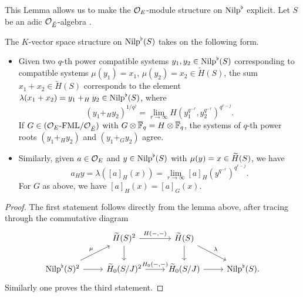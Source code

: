 \documentclass[../main.tex]{subfiles}
\begin{document}
This Lemma allows us to make the $\cO_E$-module structure on $\Nilp^\flat$
explicit. Let $S$ be an adic $\cO_\br E$-algebra .

\begin{lem}\label{lem:GroupStructureOnNilp}
  The $K$-vector space structure on $\Nilp^\flat(S)$ takes on the following form.
  \begin{itemize}
    \item Given two $q$-th power compatible systems $y_1, y_2
      \in \Nilp^\flat(S)$ corresponding to compatible systems
      $\mu(y_1) = x_1$, $\mu(y_2) = x_2 \in \tilde H(S)$, the sum $x_1 + x_2 \in
      \tilde H(S)$ corresponds to the element $\lambda(x_1 + x_2) = y_1 +_H y_2 \in
      \Nilp^\flat(S)$, where 
      \begin{equation*}
        (y_1 +_H y_2)^{1/q^j} = \lim_{r \to \infty} H( y_1^{q^{-r}},
        y_2^{q^{-r}})^{q^{r-j}}.
      \end{equation*}
      If $G \in \FMLOver {\cO_E}{\cO_\br E}$ with $G \otimes \Fqbar = H \otimes \Fqbar$,
      the systems of $q$-th power roots $(y_1 +_H y_2)$ and $(y_1 +_G y_2)$ agree. 
    \item Similarly, given $a \in \cO_E$ and $y \in \Nilp^\flat(S)$ with
      $\mu(y) = x \in \Tilde H(S)$, we have 
      \begin{equation*}
        a_H y = \lambda([a]_H(x)) = \lim_{r \to \infty} [a]_H(y^{q^{-r}})^{q^{r-j}}.
      \end{equation*}
      For $G$ as above, we have $[a]_H(x) = [a]_G(x)$. 
  \end{itemize}
\begin{proof}
  The first statement follows directly from the lemma above, after tracing
  through the commutative diagram
  \begin{equation*}
    \begin{tikzcd}[ampersand replacement=\&]
    	\& {\Tilde H(S)^2} \& {\Tilde H(S)} \\
    	{\Nilp^\flat(S)^2} \& {\Tilde H_0(S/J)^2} \& {\Tilde H_0(S/J)} \& {\Nilp^\flat(S).}
    	\arrow["{H(-,-)}", from=1-2, to=1-3]
    	\arrow[ from=1-2, to=2-2]
    	\arrow[ from=1-3, to=2-3]
    	\arrow["\lambda", from=1-3, to=2-4]
    	\arrow["\mu", from=2-1, to=1-2]
    	\arrow[ from=2-1, to=2-2]
    	\arrow["{H_0(-,-)}", from=2-2, to=2-3]
    	\arrow[from=2-3, to=2-4]
    \end{tikzcd}
  \end{equation*}
  Similarly one proves the third statement.
\end{proof}
\end{lem}
\end{document}
